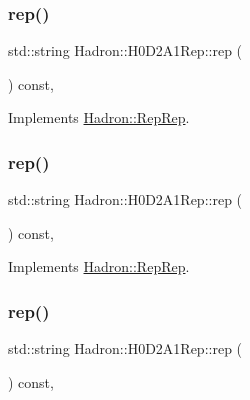 \subsubsection{\texorpdfstring{rep()}{rep()}\hspace{0.1cm}{\footnotesize\ttfamily [2/5]}}
{\footnotesize\ttfamily std\+::string Hadron\+::\+H0\+D2\+A1\+Rep\+::rep (\begin{DoxyParamCaption}{ }\end{DoxyParamCaption}) const\hspace{0.3cm}{\ttfamily [inline]}, {\ttfamily [virtual]}}



Implements \mbox{\hyperlink{structHadron_1_1RepRep_ab3213025f6de249f7095892109575fde}{Hadron\+::\+Rep\+Rep}}.

\mbox{\label{structHadron_1_1H0D2A1Rep_ac7e30eadba7f3a5049f2bde305ca28c5}} 
\subsubsection{\texorpdfstring{rep()}{rep()}\hspace{0.1cm}{\footnotesize\ttfamily [3/5]}}
{\footnotesize\ttfamily std\+::string Hadron\+::\+H0\+D2\+A1\+Rep\+::rep (\begin{DoxyParamCaption}{ }\end{DoxyParamCaption}) const\hspace{0.3cm}{\ttfamily [inline]}, {\ttfamily [virtual]}}



Implements \mbox{\hyperlink{structHadron_1_1RepRep_ab3213025f6de249f7095892109575fde}{Hadron\+::\+Rep\+Rep}}.

\mbox{\label{structHadron_1_1H0D2A1Rep_ac7e30eadba7f3a5049f2bde305ca28c5}} 
\subsubsection{\texorpdfstring{rep()}{rep()}\hspace{0.1cm}{\footnotesize\ttfamily [4/5]}}
{\footnotesize\ttfamily std\+::string Hadron\+::\+H0\+D2\+A1\+Rep\+::rep (\begin{DoxyParamCaption}{ }\end{DoxyParamCaption}) const\hspace{0.3cm}{\ttfamily [inline]}, {\ttfamily [virtual]}}



